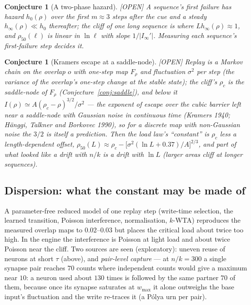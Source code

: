 \documentclass[11pt]{article}
\theoremstyle{definition}
\theoremstyle{plain}
\newtheorem{conjecture}[lemma]{Conjecture}
\newcommand{\OPEN}{\textnormal{\footnotesize\textsf{[OPEN]}}}
\begin{document}
\begin{conjecture}[A two-phase hazard]\label{conj:twophase} \OPEN
A sequence's first failure has hazard $h_0(\rho)$ over the first $m \approx 3$
steps after the cue and a steady $h_\infty(\rho) \ll h_0$ thereafter; the cliff
of one long sequence is where $L h_\infty(\rho) \approx 1$, and $\rho_{50}(\ell)$ is
linear in $\ln \ell$ with slope $1/|I_\infty'|$. Measuring each sequence's
first-failure step decides it.
\end{conjecture}

\begin{conjecture}[Kramers escape at a saddle-node]\label{conj:kramers} \OPEN
Replay is a Markov chain on the overlap $o$ with one-step map $F_\rho$ and
fluctuation $\sigma^2$ per step (the variance of the overlap's one-step change
at the stable state); the cliff's $\rho_c$ is the saddle-node of $F_\rho$
(Conjecture~\ref{conj:saddle}), and below it
$I(\rho) \simeq A(\rho_c - \rho)^{3/2}/\sigma^2$ --- the exponent of escape over
the cubic barrier left near a saddle-node with Gaussian noise in continuous
time (Kramers 1940; H\"anggi, Talkner and Borkovec 1990), so for a discrete map
with non-Gaussian noise the $3/2$ is itself a prediction. Then the load law's
``constant'' is $\rho_c$ less a length-dependent offset,
$\rho_{50}(L) \approx \rho_c - \bigl[\sigma^2 (\ln L + 0.37)/A\bigr]^{2/3}$, and
part of what looked like a drift with $n/k$ is a drift with $\ln L$ (larger
areas cliff at longer sequences).
\end{conjecture}

\subsection{Dispersion: what the constant may be made of}\label{sec:dispersion}

A parameter-free reduced model of one replay step (write-time selection, the
learned transition, Poisson interference, normalisation, $k$-WTA) reproduces
the measured overlap maps to $0.02$--$0.03$ but places the critical load about
twice too high. In the engine the interference is Poisson at light load and
about twice Poisson near the cliff. Two sources are seen (exploratory): uneven
reuse of neurons at short $\tau$ (above), and \emph{pair-level capture} --- at
$n/k = 300$ a single synapse pair reaches $70$ counts where independent counts
would give a maximum near $10$: a neuron used about $130$ times is followed by
the same partner $70$ of them, because once its synapse saturates at $w_{\max}$
it alone outweighs the base input's fluctuation and the write re-traces it (a
P\'olya urn per pair).
\end{document}
